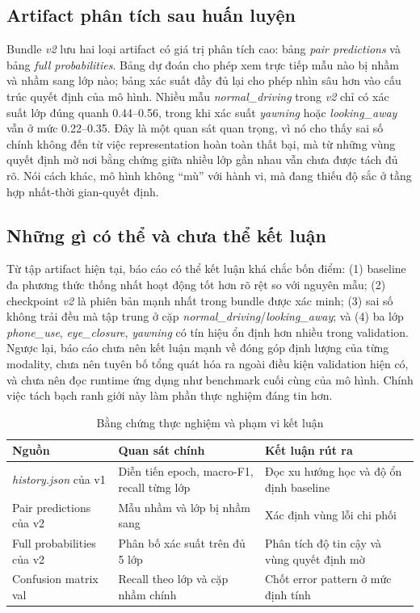\documentclass[conference,a4paper]{IEEEtran}
\begin{document}
\subsection{Artifact phân tích sau huấn luyện}
Bundle \textit{v2} lưu hai loại artifact có giá trị phân tích cao: bảng \textit{pair predictions} và bảng \textit{full probabilities}. Bảng dự đoán cho phép xem trực tiếp mẫu nào bị nhầm và nhầm sang lớp nào; bảng xác suất đầy đủ lại cho phép nhìn sâu hơn vào cấu trúc quyết định của mô hình. Nhiều mẫu \textit{normal\_driving} trong \textit{v2} chỉ có xác suất lớp đúng quanh 0.44--0.56, trong khi xác suất \textit{yawning} hoặc \textit{looking\_away} vẫn ở mức 0.22--0.35. Đây là một quan sát quan trọng, vì nó cho thấy sai số chính không đến từ việc representation hoàn toàn thất bại, mà từ những vùng quyết định mờ nơi bằng chứng giữa nhiều lớp gần nhau vẫn chưa được tách đủ rõ. Nói cách khác, mô hình không ``mù'' với hành vi, mà đang thiếu độ sắc ở tầng hợp nhất-thời gian-quyết định.

\subsection{Những gì có thể và chưa thể kết luận}
Từ tập artifact hiện tại, báo cáo có thể kết luận khá chắc bốn điểm: (1) baseline đa phương thức thống nhất hoạt động tốt hơn rõ rệt so với nguyên mẫu; (2) checkpoint \textit{v2} là phiên bản mạnh nhất trong bundle được xác minh; (3) sai số không trải đều mà tập trung ở cặp \textit{normal\_driving}/\textit{looking\_away}; và (4) ba lớp \textit{phone\_use}, \textit{eye\_closure}, \textit{yawning} có tín hiệu ổn định hơn nhiều trong validation. Ngược lại, báo cáo chưa nên kết luận mạnh về đóng góp định lượng của từng modality, chưa nên tuyên bố tổng quát hóa ra ngoài điều kiện validation hiện có, và chưa nên đọc runtime ứng dụng như benchmark cuối cùng của mô hình. Chính việc tách bạch ranh giới này làm phần thực nghiệm đáng tin hơn.

\begin{table}[t]
\caption{Bằng chứng thực nghiệm và phạm vi kết luận}
\label{tab:evidence-scope}
\centering
\scriptsize
\begin{tabular}{L{1.7cm}L{2.45cm}L{1.95cm}}
\toprule
Nguồn & Quan sát chính & Kết luận rút ra \\
\midrule
\textit{history.json} của v1 & Diễn tiến epoch, macro-F1, recall từng lớp & Đọc xu hướng học và độ ổn định baseline \\
Pair predictions của v2 & Mẫu nhầm và lớp bị nhầm sang & Xác định vùng lỗi chi phối \\
Full probabilities của v2 & Phân bố xác suất trên đủ 5 lớp & Phân tích độ tin cậy và vùng quyết định mờ \\
Confusion matrix val & Recall theo lớp và cặp nhầm chính & Chốt error pattern ở mức định tính \\
\bottomrule
\end{tabular}
\end{table}
\end{document}
